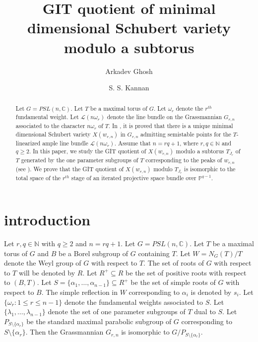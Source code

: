 \documentclass[12pt,reqno]{amsart}
\numberwithin{equation}{section}
\theoremstyle{definition}
\begin{document}
	
	\title{GIT quotient of minimal dimensional Schubert variety modulo a subtorus }	
	\author{Arkadev Ghosh }
		\address{Chennai Mathematical Institute, Plot H1, SIPCOT IT Park, Siruseri, Kelambakkam, 603103, India.}
			\author{S. S. Kannan}
		\address{Chennai Mathematical Institute, Plot H1, SIPCOT IT Park, Siruseri, Kelambakkam, 603103, India.}	
	\maketitle 		

\begin{abstract}
Let $G=PSL(n,\mathbb{C})$. Let $T$ be a maximal torus of $G$. Let $\omega_{r}$ denote the $r^{th}$ fundamental weight.  Let $\mathcal{L}(n\omega_{r})$ denote the line bundle on the Grassmannian $G_{r,n}$ associated to the character $n\omega_{r}$ of $T$.
In \cite{sskannan}, it is proved that there is a unique minimal dimensional Schubert variety $X(w_{r,n})$ in $G_{r,n}$ admitting semistable points for the $T$-linearized ample line bundle $\mathcal{L}(n\omega_{r})$. Assume that $n=rq+1$, where $r,q\in\mathbb{N}$ and $q\geq 2$. In this paper, we study the GIT quotient of $X(w_{r,n})$ modulo a subtorus $T_{J_{r}}$ of $T$ generated by the one parameter subgroups of $T$ corresponding to the peaks of $w_{r,n}$ (see \cite[Definition 4.6]{Perrin}). We prove that the GIT quotient of $X(w_{r,n})$ modulo $T_{J_{r}}$ is isomorphic to the total space of the $r^{th}$ stage of an iterated projective space bundle over $\mathbb{P}^{q-1}$.
\end{abstract}		
\section{introduction} Let $r,q\in\mathbb{N}$ with $q\geq 2$ and $n=rq+1$. Let $G=PSL(n,\mathbb{C})$.
Let $T$ be a maximal torus of $G$ and $B$ be a Borel subgroup of $G$ containing $T$. Let $W=N_{G}(T)/T$ denote the Weyl group of $G$ with respect to $T$. The set of roots of $G$ with respect to $T$ will be denoted by $R$. Let $R^{+}\subseteq R$ be the set of positive roots with respect to $(B,T)$. Let $S=\{\alpha_{1},\ldots,\alpha_{n-1}\}\subseteq R^{+}$ be the set of simple roots of $G$ with respect to $B$. The simple reflection in $W$ corresponding to $\alpha_{i}$ is denoted by $s_{i}$. Let $\{\omega_{r}:1\leq r\leq n-1\}$ denote the fundamental weights associated to $S$. Let $\{\lambda_{1},\ldots,\lambda_{n-1}\}$ denote the set of one parameter subgroups of $T$ dual to $S$. Let $P_{S\setminus\{\alpha_{r}\}}$ be the standard maximal parabolic subgroup of $G$ corresponding to $S\setminus\{\alpha_{r}\}$. Then the Grassmannian $G_{r,n}$ is isomorphic to $G/P_{S\setminus\{\alpha_{r}\}}$.
\end{document}
